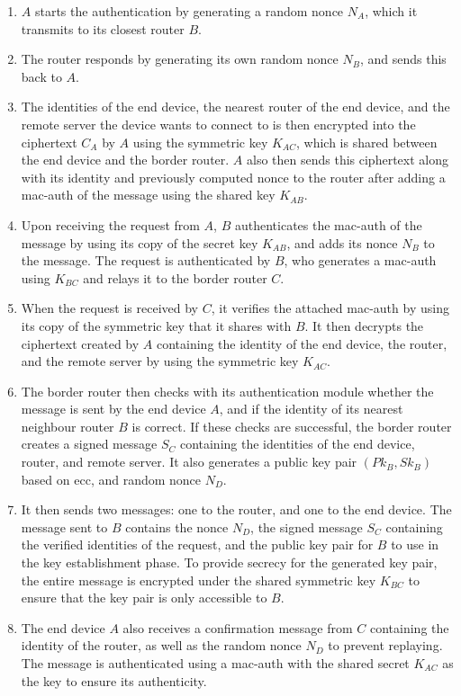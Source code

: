 \begin{enumerate}

\item $A$ starts the authentication by generating a random nonce $N_A$, which it transmits to its closest router $B$.

\item The router responds by generating its own random nonce $N_B$, and sends this back to $A$.

\item The identities of the end device, the nearest router of the end device, and the remote server the device wants to connect to is then encrypted into the ciphertext $C_A$ by $A$ using the symmetric key $K_{AC}$, which is shared between the end device and the border router. $A$ also then sends this ciphertext along with its identity and previously computed nonce to the router after adding a \gls{mac-auth} of the message using the shared key $K_{AB}$.

\item Upon receiving the request from $A$, $B$ authenticates the \gls{mac-auth} of the message by using its copy of the secret key $K_{AB}$, and adds its nonce $N_B$ to the message. The request is authenticated by $B$, who generates a \gls{mac-auth} using $K_{BC}$ and relays it to the border router $C$.

\item When the request is received by $C$, it verifies the attached \gls{mac-auth} by using its copy of the symmetric key that it shares with $B$. It then decrypts the ciphertext created by $A$ containing the identity of the end device, the router, and the remote server by using the symmetric key $K_{AC}$.

\item The border router then checks with its authentication module whether the message is sent by the end device $A$, and if the identity of its nearest neighbour router $B$ is correct. If these checks are successful, the border router creates a signed message $S_C$ containing the identities of the end device, router, and remote server. It also generates a public key pair $(Pk_B, Sk_B)$ based on \gls{ecc}, and random nonce $N_D$.

\item It then sends two messages: one to the router, and one to the end device. The message sent to $B$ contains the nonce $N_D$, the signed message $S_C$ containing the verified identities of the request, and the public key pair for $B$ to use in the key establishment phase. To provide secrecy for the generated key pair, the entire message is encrypted under the shared symmetric key $K_{BC}$ to ensure that the key pair is only accessible to $B$.

\item The end device $A$ also receives a confirmation message from $C$ containing the identity of the router, as well as the random nonce $N_D$ to prevent replaying. The message is authenticated using a \gls{mac-auth} with the shared secret $K_{AC}$ as the key to ensure its authenticity.

\end{enumerate}



